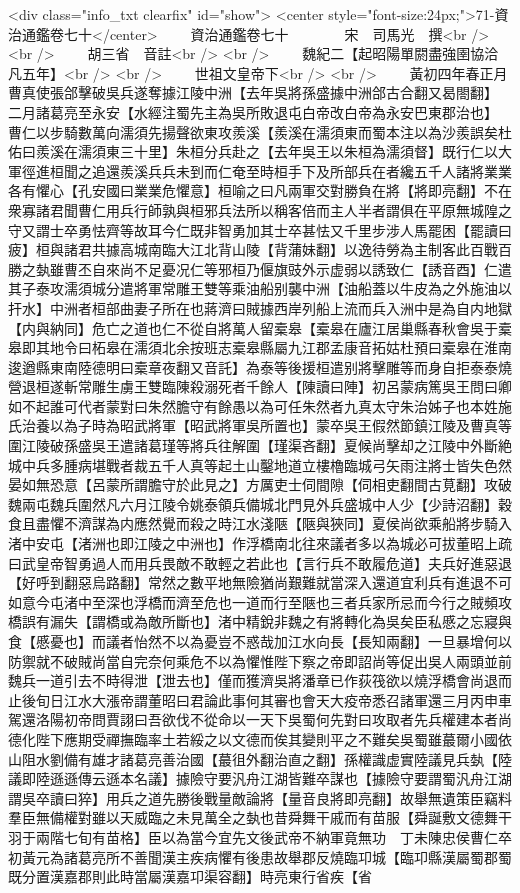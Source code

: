 <div class="info_txt clearfix" id="show">
<center style="font-size:24px;">71-資治通鑑卷七十</center>
  　　資治通鑑卷七十　　　　宋　司馬光　撰<br />
<br />
　　胡三省　音註<br />
<br />
　　魏紀二【起昭陽單閼盡強圉協洽凡五年】<br />
<br />
　　世祖文皇帝下<br />
<br />
　　黃初四年春正月曹真使張郃擊破吳兵遂奪據江陵中洲【去年吳將孫盛據中洲郃古合翻又曷閤翻】　二月諸葛亮至永安【水經注蜀先主為吳所敗退屯白帝改白帝為永安巴東郡治也】　曹仁以步騎數萬向濡須先揚聲欲東攻羨溪【羨溪在濡須東而蜀本注以為沙羨誤矣杜佑曰羨溪在濡須東三十里】朱桓分兵赴之【去年吳王以朱桓為濡須督】既行仁以大軍徑進桓聞之追還羨溪兵兵未到而仁奄至時桓手下及所部兵在者纔五千人諸將業業各有懼心【孔安國曰業業危懼意】桓喻之曰凡兩軍交對勝負在將【將即亮翻】不在衆寡諸君聞曹仁用兵行師孰與桓邪兵法所以稱客倍而主人半者謂俱在平原無城隍之守又謂士卒勇怯齊等故耳今仁既非智勇加其士卒甚怯又千里步涉人馬罷困【罷讀曰疲】桓與諸君共據高城南臨大江北背山陵【背蒲妹翻】以逸待勞為主制客此百戰百勝之埶雖曹丕自來尚不足憂况仁等邪桓乃偃旗豉外示虚弱以誘致仁【誘音酉】仁遣其子泰攻濡須城分遣將軍常雕王雙等乘油船别襲中洲【油船蓋以牛皮為之外施油以扞水】中洲者桓部曲妻子所在也蔣濟曰賊據西岸列船上流而兵入洲中是為自内地獄【内與納同】危亡之道也仁不從自將萬人留槖皋【槖皋在廬江居巢縣春秋會吳于槖皋即其地令曰柘皋在濡須北余按班志槖皋縣屬九江郡孟康音拓姑杜預曰槖皋在淮南逡遒縣東南陸德明曰槖章夜翻又音託】為泰等後援桓遣别將擊雕等而身自拒泰泰燒營退桓遂斬常雕生虜王雙臨陳殺溺死者千餘人【陳讀曰陣】初呂蒙病篤吳王問曰卿如不起誰可代者蒙對曰朱然膽守有餘愚以為可任朱然者九真太守朱治姊子也本姓施氏治養以為子時為昭武將軍【昭武將軍吳所置也】蒙卒吳王假然節鎮江陵及曹真等圍江陵破孫盛吳王遣諸葛瑾等將兵往解圍【瑾渠吝翻】夏候尚擊却之江陵中外斷絶城中兵多腫病堪戰者裁五千人真等起土山鑿地道立樓櫓臨城弓矢雨注將士皆失色然晏如無恐意【呂蒙所謂膽守於此見之】方厲吏士伺間隙【伺相吏翻間古莧翻】攻破魏兩屯魏兵圍然凡六月江陵令姚泰領兵備城北門見外兵盛城中人少【少詩沼翻】穀食且盡懼不濟謀為内應然覺而殺之時江水淺陿【陿與狹同】夏侯尚欲乘船將步騎入渚中安屯【渚洲也即江陵之中洲也】作浮橋南北往來議者多以為城必可拔董昭上疏曰武皇帝智勇過人而用兵畏敵不敢輕之若此也【言行兵不敢履危道】夫兵好進惡退【好呼到翻惡烏路翻】常然之數平地無險猶尚艱難就當深入還道宜利兵有進退不可如意今屯渚中至深也浮橋而濟至危也一道而行至陿也三者兵家所忌而今行之賊頻攻橋誤有漏失【謂橋或為敵所斷也】渚中精銳非魏之有將轉化為吳矣臣私慼之忘寢與食【慼憂也】而議者怡然不以為憂豈不惑哉加江水向長【長知兩翻】一旦暴增何以防禦就不破賊尚當自完奈何乘危不以為懼惟陛下察之帝即詔尚等促出吳人兩頭並前魏兵一道引去不時得泄【泄去也】僅而獲濟吳將潘章已作荻筏欲以燒浮橋會尚退而止後旬日江水大漲帝謂董昭曰君論此事何其審也會天大疫帝悉召諸軍還三月丙申車駕還洛陽初帝問賈詡曰吾欲伐不從命以一天下吳蜀何先對曰攻取者先兵權建本者尚德化陛下應期受禪撫臨率土若綏之以文德而俟其變則平之不難矣吳蜀雖蕞爾小國依山阻水劉備有雄才諸葛亮善治國【蕞徂外翻治直之翻】孫權識虚實陸議見兵埶【陸議即陸遜遜傳云遜本名議】據險守要汎舟江湖皆難卒謀也【據險守要謂蜀汎舟江湖謂吳卒讀曰猝】用兵之道先勝後戰量敵論將【量音良將即亮翻】故舉無遺策臣竊料羣臣無備權對雖以天威臨之未見萬全之埶也昔舜舞干戚而有苗服【舜誕敷文德舞干羽于兩階七旬有苗格】臣以為當今宜先文後武帝不納軍竟無功　丁未陳忠侯曹仁卒　初黃元為諸葛亮所不善聞漢主疾病懼有後患故舉郡反燒臨卭城【臨卭縣漢屬蜀郡蜀既分置漢嘉郡則此時當屬漢嘉卭渠容翻】時亮東行省疾【省